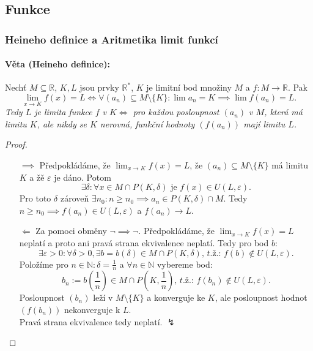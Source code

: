 \documentclass[10pt,a4paper]{article}
\newcommand{\N}{{\mathbb{N}}}
\newcommand{\R}{{\mathbb{R}}}
\begin{document}
\subsection{Funkce}

\subsubsection{Heineho deﬁnice a Aritmetika limit funkcí}

\paragraph*{Věta (Heineho deﬁnice):} Nechť $M \subseteq \R$, $K, L$ jsou prvky $\R^*$, $K$ je limitní bod množiny $M$ a $f : M \to \R$. 
Pak \[
    \lim_{x\to K}f(x) = L \iff \forall (a_n)\subseteq M\setminus \{K\}: \lim a_n = K \implies \lim f(a_n) = L.
\] \textit{Tedy $L$ je limita funkce $f$ v $K \iff$ pro každou posloupnost $(a_n)$ v $M$, 
která má limitu $K$, ale nikdy se $K$ nerovná, funkční hodnoty $(f(a_n))$ mají limitu $L$.}

\begin{proof}
    $ $

    \begin{itemize}
        \item [$\implies$] Předpokládáme, že $\displaystyle \lim_{x\to K} f(x) = L$, že
        $(a_n) \subseteq M \setminus \{K\}$ má limitu $K$ a žě $\varepsilon$ je dáno. 
        Potom $$\exists \delta: \forall x \in M \cap P(K, \delta) \text{ je } f(x) \in U(L, \varepsilon).$$ 
        Pro toto $\delta$ zároveň $\exists n_0: n \geq n_0 \implies a_n \in P (K, \delta) \cap M$. 
        Tedy $n \geq n_0 \implies f(a_n) \in U(L, \varepsilon)$ a $f(a_n) \to L$.
        \item[$\Longleftarrow$] Za pomoci obměny $\neg \implies \neg$. 
        Předpokládáme, že $\displaystyle \lim_{x\to K} f(x) = L$ neplatí a proto ani pravá strana ekvivalence neplatí. 
        Tedy pro bod $b$: $$\exists \varepsilon > 0: \forall \delta > 0, \exists b = b(\delta) \in M \cap P(K, \delta) \textit{, t.ž.: } f(b) \notin U(L, \varepsilon).$$
        Položíme pro $n \in \N: \delta = \frac 1n$ a $\forall n\in \N$ vybereme bod:
        $$b_n := b\left(\frac 1n\right) \in M \cap P\left(K, \frac 1n\right)\textit{, t.ž.: }f(b_n) \notin U(L, \varepsilon).$$
        Posloupnost $(b_n)$ leží v $M \setminus \{K\}$ a konverguje ke $K$, ale posloupnost hodnot $(f(b_n))$
        nekonverguje k $L$.\\Pravá strana ekvivalence tedy neplatí. $\lightning$
    \end{itemize}
\end{proof}
\end{document}
